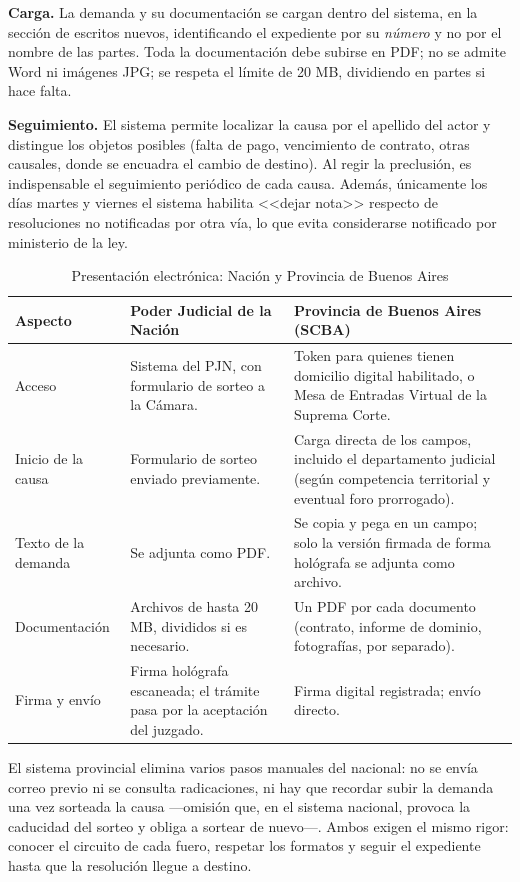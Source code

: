 \documentclass[12pt,oneside]{book}
\begin{document}
\textbf{Carga.} La demanda y su documentación se cargan dentro del sistema, en la sección de escritos nuevos, identificando el expediente por su \emph{número} y no por el nombre de las partes. Toda la documentación debe subirse en PDF; no se admite Word ni imágenes JPG; se respeta el límite de 20 MB, dividiendo en partes si hace falta.

\textbf{Seguimiento.} El sistema permite localizar la causa por el apellido del actor y distingue los objetos posibles (falta de pago, vencimiento de contrato, otras causales, donde se encuadra el cambio de destino). Al regir la preclusión, es indispensable el seguimiento periódico de cada causa. Además, únicamente los días martes y viernes el sistema habilita <<dejar nota>> respecto de resoluciones no notificadas por otra vía, lo que evita considerarse notificado por ministerio de la ley.

\begin{table}[H]
\centering
\caption{Presentación electrónica: Nación y Provincia de Buenos Aires}
\begin{tabularx}{\textwidth}{>{\raggedright\arraybackslash}p{} >{\raggedright\arraybackslash}p{} X}
\toprule
\textbf{Aspecto} & \textbf{Poder Judicial de la Nación} & \textbf{Provincia de Buenos Aires (SCBA)} \\
\midrule
Acceso & Sistema del PJN, con formulario de sorteo a la Cámara. & Token para quienes tienen domicilio digital habilitado, o Mesa de Entradas Virtual de la Suprema Corte. \\
Inicio de la causa & Formulario de sorteo enviado previamente. & Carga directa de los campos, incluido el departamento judicial (según competencia territorial y eventual foro prorrogado). \\
Texto de la demanda & Se adjunta como PDF. & Se copia y pega en un campo; solo la versión firmada de forma hológrafa se adjunta como archivo. \\
Documentación & Archivos de hasta 20 MB, divididos si es necesario. & Un PDF por cada documento (contrato, informe de dominio, fotografías, por separado). \\
Firma y envío & Firma hológrafa escaneada; el trámite pasa por la aceptación del juzgado. & Firma digital registrada; envío directo. \\
\bottomrule
\end{tabularx}
\end{table}

El sistema provincial elimina varios pasos manuales del nacional: no se envía correo previo ni se consulta radicaciones, ni hay que recordar subir la demanda una vez sorteada la causa ---omisión que, en el sistema nacional, provoca la caducidad del sorteo y obliga a sortear de nuevo---. Ambos exigen el mismo rigor: conocer el circuito de cada fuero, respetar los formatos y seguir el expediente hasta que la resolución llegue a destino.
\end{document}
